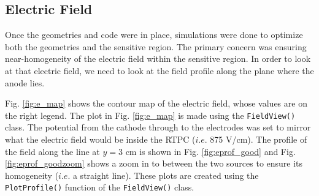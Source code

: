 \subsection{Electric Field}
Once the geometries and code were in place, simulations were done to optimize both the geometries and the sensitive region. The primary concern was ensuring near-homogeneity of the electric field within the sensitive region. In order to look at that electric field, we need to look at the field profile along the plane where the anode lies. 

Fig. \ref{fig:e_map} shows the contour map of the electric field, whose values are on the right legend. The plot in Fig. \ref{fig:e_map} is made using the \lstinline|FieldView()| class. The potential from the cathode through to the electrodes was set to mirror what the electric field would be inside the RTPC ($i.e.$ 875 V/cm). The profile of the field along the line at $y=3$ cm is shown in Fig. \ref{fig:eprof_good} and Fig. \ref{fig:eprof_goodzoom} shows a zoom in to between the two sources to ensure its homogeneity ($i.e.$ a straight line). These plots are created using the \lstinline|PlotProfile()| function of the \lstinline|FieldView()| class.

